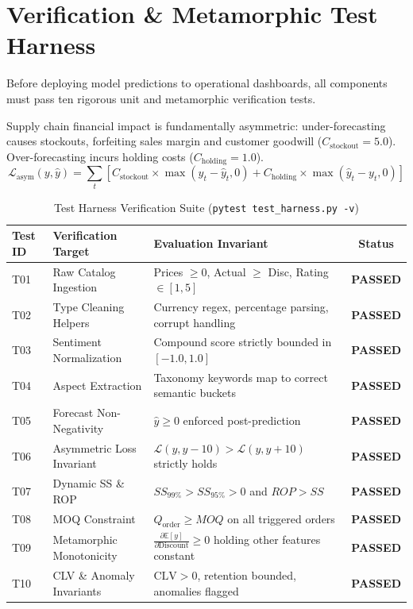 \documentclass[11pt,a4paper]{article}
\begin{document}
\section{Verification \& Metamorphic Test Harness}
Before deploying model predictions to operational dashboards, all components must pass ten rigorous unit and metamorphic verification tests.

\begin{tcolorbox}[title=Asymmetric Business Loss Function]
Supply chain financial impact is fundamentally asymmetric: under-forecasting causes stockouts, forfeiting sales margin and customer goodwill ($C_{\text{stockout}} = 5.0$). Over-forecasting incurs holding costs ($C_{\text{holding}} = 1.0$).
\begin{equation}
    \mathcal{L}_{\text{asym}}(y, \hat{y}) = \sum_{t} \left[ C_{\text{stockout}} \times \max(y_t - \hat{y}_t, 0) + C_{\text{holding}} \times \max(\hat{y}_t - y_t, 0) \right]
\end{equation}
\end{tcolorbox}

\begin{table}[h!]
\centering
\small
\caption{Test Harness Verification Suite (\texttt{pytest test\_harness.py -v})}
\label{tab:test_results}
\vspace{0.5em}
\begin{tabular}{l l l c}
\toprule
\textbf{Test ID} & \textbf{Verification Target} & \textbf{Evaluation Invariant} & \textbf{Status} \\
\midrule
T01 & Raw Catalog Ingestion & Prices $\ge 0$, Actual $\ge$ Disc, Rating $\in [1, 5]$ & \textbf{PASSED} \\
T02 & Type Cleaning Helpers & Currency regex, percentage parsing, corrupt handling & \textbf{PASSED} \\
T03 & Sentiment Normalization & Compound score strictly bounded in $[-1.0, 1.0]$ & \textbf{PASSED} \\
T04 & Aspect Extraction & Taxonomy keywords map to correct semantic buckets & \textbf{PASSED} \\
T05 & Forecast Non-Negativity & $\hat{y} \ge 0$ enforced post-prediction & \textbf{PASSED} \\
T06 & Asymmetric Loss Invariant & $\mathcal{L}(y, y - 10) > \mathcal{L}(y, y + 10)$ strictly holds & \textbf{PASSED} \\
T07 & Dynamic SS \& ROP & $SS_{99\%} > SS_{95\%} > 0$ and $ROP > SS$ & \textbf{PASSED} \\
T08 & MOQ Constraint & $Q_{\text{order}} \ge MOQ$ on all triggered orders & \textbf{PASSED} \\
T09 & Metamorphic Monotonicity & $\frac{\partial \mathbb{E}[y]}{\partial \text{Discount}} \ge 0$ holding other features constant & \textbf{PASSED} \\
T10 & CLV \& Anomaly Invariants & $\text{CLV} > 0$, retention bounded, anomalies flagged & \textbf{PASSED} \\
\bottomrule
\end{tabular}
\end{table}
\end{document}
